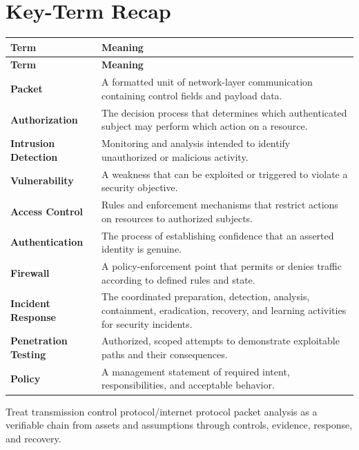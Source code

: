 \documentclass[11pt]{article}
\begin{document}
\section*{Key-Term Recap}
\begin{longtable}{>{\RaggedRight\arraybackslash}p{}>{\RaggedRight\arraybackslash}p{}}
\toprule\rowcolor{Navy}\color{white}\textbf{Term} & \color{white}\textbf{Meaning}\\\midrule
\endfirsthead
\toprule\rowcolor{Navy}\color{white}\textbf{Term} & \color{white}\textbf{Meaning}\\\midrule
\endhead
\textbf{Packet} & A formatted unit of network-layer communication containing control fields and payload data. \\\midrule
\textbf{Authorization} & The decision process that determines which authenticated subject may perform which action on a resource. \\\midrule
\textbf{Intrusion Detection} & Monitoring and analysis intended to identify unauthorized or malicious activity. \\\midrule
\textbf{Vulnerability} & A weakness that can be exploited or triggered to violate a security objective. \\\midrule
\textbf{Access Control} & Rules and enforcement mechanisms that restrict actions on resources to authorized subjects. \\\midrule
\textbf{Authentication} & The process of establishing confidence that an asserted identity is genuine. \\\midrule
\textbf{Firewall} & A policy-enforcement point that permits or denies traffic according to defined rules and state. \\\midrule
\textbf{Incident Response} & The coordinated preparation, detection, analysis, containment, eradication, recovery, and learning activities for security incidents. \\\midrule
\textbf{Penetration Testing} & Authorized, scoped attempts to demonstrate exploitable paths and their consequences. \\\midrule
\textbf{Policy} & A management statement of required intent, responsibilities, and acceptable behavior. \\\midrule
\bottomrule
\end{longtable}
\begin{takeawaybox}
Treat transmission control protocol/internet protocol packet analysis as a verifiable chain from assets and assumptions through controls, evidence, response, and recovery.
\end{takeawaybox}
\end{document}
